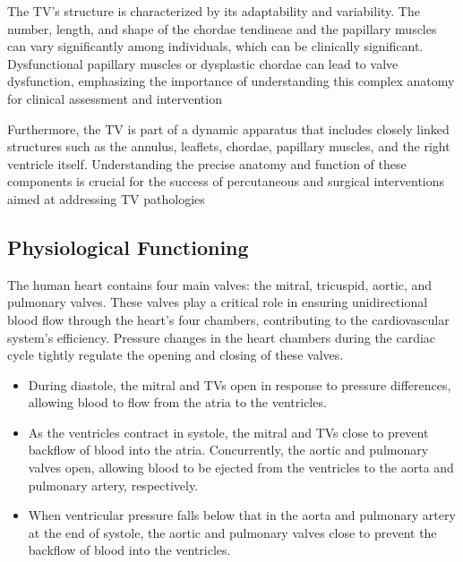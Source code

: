 The \gls{TV}'s structure is characterized by its adaptability and variability. The number, length, and shape of the chordae tendineae and the papillary muscles can vary significantly among individuals, which can be clinically significant. Dysfunctional papillary muscles or dysplastic chordae can lead to valve dysfunction, emphasizing the importance of understanding this complex anatomy for clinical assessment and intervention ~

Furthermore, the \gls{TV} is part of a dynamic apparatus that includes closely linked structures such as the annulus, leaflets, chordae, papillary muscles, and the right ventricle itself. Understanding the precise anatomy and function of these components is crucial for the success of percutaneous and surgical interventions aimed at addressing \gls{TV} pathologies ~
\subsection{Physiological Functioning}
The human heart contains four main valves: the mitral, tricuspid, aortic, and pulmonary valves. These valves play a critical role in ensuring unidirectional blood flow through the heart's four chambers, contributing to the cardiovascular system's efficiency. Pressure changes in the heart chambers during the cardiac cycle tightly regulate the opening and closing of these valves.

\begin{itemize}
    \item During diastole, the mitral and \gls{TV}s open in response to pressure differences, allowing blood to flow from the atria to the ventricles.
    \item As the ventricles contract in systole, the mitral and \gls{TV}s close to prevent backflow of blood into the atria. Concurrently, the aortic and pulmonary valves open, allowing blood to be ejected from the ventricles to the aorta and pulmonary artery, respectively.
    \item When ventricular pressure falls below that in the aorta and pulmonary artery at the end of systole, the aortic and pulmonary valves close to prevent the backflow of blood into the ventricles.
\end{itemize}

